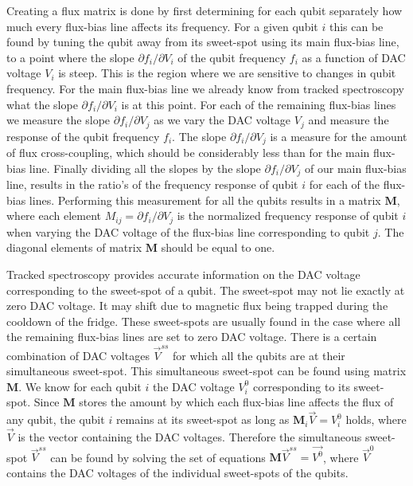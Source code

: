         Creating a flux matrix is done by first determining for each qubit separately how much every flux-bias line affects its frequency. For a given qubit $i$ this can be found by tuning the qubit away from its sweet-spot using its main flux-bias line, to a point where the slope $\partial f_i/\partial V_i$ of the qubit frequency $f_i$ as a function of DAC voltage $V_i$ is steep. This is the region where we are sensitive to changes in qubit frequency. For the main flux-bias line we already know from tracked spectroscopy what the slope $\partial f_i / \partial V_i$ is at this point. For each of the remaining flux-bias lines we measure the slope $\partial f_i / \partial V_j$ as we vary the DAC voltage $V_j$ and measure the response of the qubit frequency $f_i$. The slope $\partial f_i / \partial V_j$ is a measure for the amount of flux cross-coupling, which should be considerably less than for the main flux-bias line. Finally dividing all the slopes by the slope $\partial f_i / \partial V_j$ of our main flux-bias line, results in the ratio's of the frequency response of qubit $i$ for each of the flux-bias lines. Performing this measurement for all the qubits results in a matrix $\boldsymbol{M}$, where each element $M_{ij}=\partial f_i / \partial V_j$ is the normalized frequency response of qubit $i$ when varying the DAC voltage of the flux-bias line corresponding to qubit $j$. The diagonal elements of matrix $\boldsymbol{M}$ should be equal to one.

        Tracked spectroscopy provides accurate information on the DAC voltage corresponding to the sweet-spot of a qubit. The sweet-spot may not lie exactly at zero DAC voltage. It may shift due to magnetic flux being trapped during the cooldown of the fridge. These sweet-spots are usually found in the case where all the remaining flux-bias lines are set to zero DAC voltage. There is a certain combination of DAC voltages $\vec{V}^{ss}$ for which all the qubits are at their simultaneous sweet-spot. This simultaneous sweet-spot can be found using matrix $\boldsymbol{M}$. We know for each qubit $i$ the DAC voltage $V^0_i$ corresponding to its sweet-spot. Since $\boldsymbol{M}$ stores the amount by which each flux-bias line affects the flux of any qubit, the qubit $i$ remains at its sweet-spot as long as $\boldsymbol{M}_i \vec{V}=V^0_i$ holds, where $\vec{V}$ is the vector containing the DAC voltages. Therefore the simultaneous sweet-spot $\vec{V}^{ss}$ can be found by solving the set of equations $\boldsymbol{M} \vec{V}^{ss} = \vec{V^0}$, where $\vec{V}^0$ contains the DAC voltages of the individual sweet-spots of the qubits.

